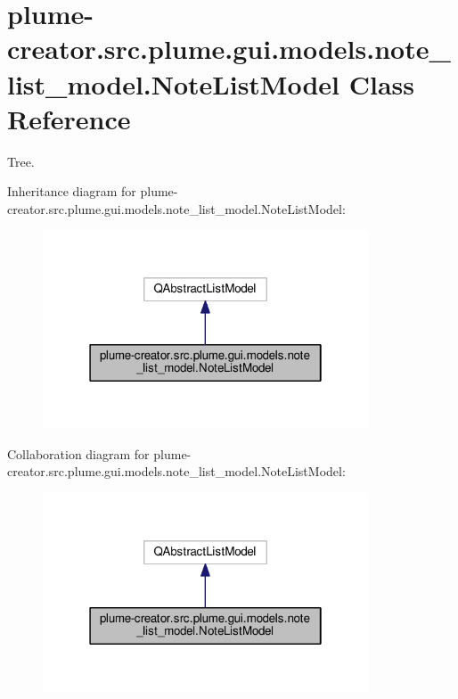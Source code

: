 \hypertarget{classplume-creator_1_1src_1_1plume_1_1gui_1_1models_1_1note__list__model_1_1_note_list_model}{}\section{plume-\/creator.src.\+plume.\+gui.\+models.\+note\+\_\+list\+\_\+model.\+Note\+List\+Model Class Reference}
\label{classplume-creator_1_1src_1_1plume_1_1gui_1_1models_1_1note__list__model_1_1_note_list_model}


Tree.  




Inheritance diagram for plume-\/creator.src.\+plume.\+gui.\+models.\+note\+\_\+list\+\_\+model.\+Note\+List\+Model\+:\nopagebreak
\begin{figure}[H]
\begin{center}
\leavevmode
\includegraphics[width=274pt]{classplume-creator_1_1src_1_1plume_1_1gui_1_1models_1_1note__list__model_1_1_note_list_model__inherit__graph}
\end{center}
\end{figure}


Collaboration diagram for plume-\/creator.src.\+plume.\+gui.\+models.\+note\+\_\+list\+\_\+model.\+Note\+List\+Model\+:\nopagebreak
\begin{figure}[H]
\begin{center}
\leavevmode
\includegraphics[width=274pt]{classplume-creator_1_1src_1_1plume_1_1gui_1_1models_1_1note__list__model_1_1_note_list_model__coll__graph}
\end{center}
\end{figure}
